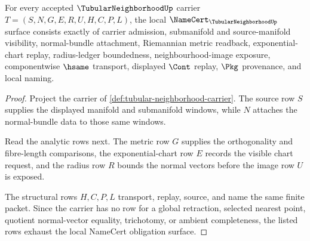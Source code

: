 \begin{theorem}
\label{thm:tubular-neighborhood-namecert-obligations}
For every accepted $\TubularNeighborhoodUp$ carrier $T=(S,N,G,E,R,U,H,C,P,L)$, the local $\NameCert_{\TubularNeighborhoodUp}$ surface consists exactly of carrier admission, submanifold and source-manifold visibility, normal-bundle attachment, Riemannian metric readback, exponential-chart replay, radius-ledger boundedness, neighbourhood-image exposure, componentwise $\hsame$ transport, displayed $\Cont$ replay, $\Pkg$ provenance, and local naming.
\end{theorem}
\begin{proof}
Project the carrier of \autoref{def:tubular-neighborhood-carrier}. The source row $S$ supplies the displayed manifold and submanifold windows, while $N$ attaches the normal-bundle data to those same windows.

Read the analytic rows next. The metric row $G$ supplies the orthogonality and fibre-length comparisons, the exponential-chart row $E$ records the visible chart request, and the radius row $R$ bounds the normal vectors before the image row $U$ is exposed.

The structural rows $H,C,P,L$ transport, replay, source, and name the same finite packet. Since the carrier has no row for a global retraction, selected nearest point, quotient normal-vector equality, trichotomy, or ambient completeness, the listed rows exhaust the local NameCert obligation surface.
\end{proof}

